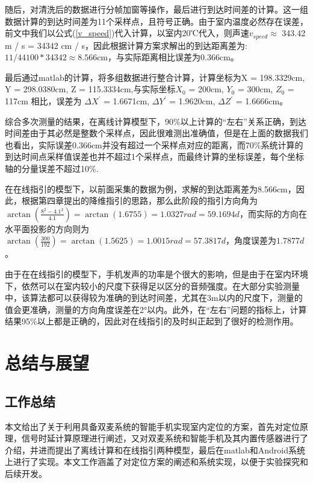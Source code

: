 \documentclass[winfonts,oneside]{njuthesis}
\begin{document}
		随后，对清洗后的数据进行分帧加窗等操作，最后进行到达时间差的计算。这一组数据计算的到达时间差为11个采样点，且符号正确。由于室内温度必然存在误差，前文中我们以公式(\ref{v_speed})代入计算，以室内20℃代入，则声速$v_{speed} \approx $ 343.42 m / s = 34342 cm / s，因此根据计算方案求解出的到达距离差为: $11 / 44100 * 34342 \approx 8.566$cm，与实际距离相比误差为0.366cm。
		
		最后通过matlab的计算，将多组数据进行整合计算，计算坐标为X = 198.3329cm, Y = 298.0380cm, Z = 115.3334cm,与实际坐标$X_0 $ = 200cm, $Y_0 $ = 300cm, $Z_0 $ = 117cm 相比，误差为 $\Delta X^{'}$ = 1.6671cm, $\Delta Y^{'}$ = 1.9620cm, $\Delta Z^{'}$ = 1.6666cm。
		
		综合多次测量的结果，在离线计算模型下，90\%以上计算的“左右”关系正确，到达时间差由于其必然是整数个采样点，因此很难测出准确值，但是在上面的数据我们也看出，实际误差0.366cm并没有超过一个采样点对应的距离，而70\%系统计算的到达时间点采样值误差也并不超过1个采样点，而最终计算的坐标误差，每个坐标轴的分量误差不超过10\%.
		
		
		在在线指引的模型下，以前面采集的数据为例，求解的到达距离差为8.566cm，因此，根据第四章提出的降维指引的思路，那么此阶段的指引方向角为$\arctan(\frac{8^2-4.1^2}{4.1}) = \arctan(1.6755) = 1.0327 rad = 59.1694 d$，而实际的方向在水平面投影的方向则为$\arctan(\frac{300}{192}) = \arctan(1.5625) = 1.0015 rad = 57.3817 d$，角度误差为$1.7877 d$。
		
		由于在在线指引的模型下，手机发声的功率是个很大的影响，但是由于在室内环境下，依然可以在室内较小的尺度下获得足以区分的音频强度。在大部分实验测量中，该算法都可以获得较为准确的到达时间差，尤其在3m以内的尺度下，测量的值会更准确，测量的方向角度误差在2°以内。此外，在“左右”问题的指标上，计算结果95\%以上都是正确的，因此对在线指引的及时纠正起到了很好的检测作用。	
		
		
\chapter{总结与展望}
	\section{工作总结}
		
		本文给出了关于利用具备双麦系统的智能手机实现室内定位的方案，首先对定位原理，信号时延计算原理进行阐述，又对双麦系统和智能手机及其内置传感器进行了介绍，并进而提出了离线计算和在线指引两种模型，最后在matlab和Android系统上进行了实现。本文工作涵盖了对定位方案的阐述和系统实现，以便于实验探究和后续开发。
	
\end{document}
